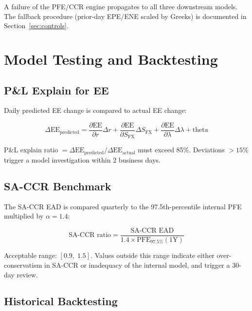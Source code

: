 \documentclass[11pt,a4paper]{article}
\begin{document}
A failure of the PFE/CCR engine propagates to all three downstream models.
The fallback procedure (prior-day EPE/ENE scaled by Greeks) is documented
in Section~\ref{sec:controls}.

\section{Model Testing and Backtesting}

\subsection{P\&L Explain for EE}

Daily predicted EE change is compared to actual EE change:

\begin{equation}
  \Delta\text{EE}_{\text{predicted}}
    = \frac{\partial \text{EE}}{\partial r} \Delta r
    + \frac{\partial \text{EE}}{\partial S_{\text{FX}}} \Delta S_{\text{FX}}
    + \frac{\partial \text{EE}}{\partial \lambda} \Delta\lambda
    + \text{theta}
\end{equation}

P\&L explain ratio $= \Delta\text{EE}_{\text{predicted}} / \Delta\text{EE}_{\text{actual}}$
must exceed 85\%. Deviations $>15\%$ trigger a model investigation within
2 business days.

\subsection{SA-CCR Benchmark}

The SA-CCR EAD is compared quarterly to the 97.5th-percentile internal PFE
multiplied by $\alpha = 1.4$:

\begin{equation}
  \text{SA-CCR ratio}
    = \frac{\text{SA-CCR EAD}}{1.4 \times \text{PFE}_{97.5\%}(1\text{Y})}
\end{equation}

Acceptable range: $[0.9,\; 1.5]$. Values outside this range indicate either
over-conservatism in SA-CCR or inadequacy of the internal model, and trigger
a 30-day review.

\subsection{Historical Backtesting}
\label{sec:backtest}
\end{document}
